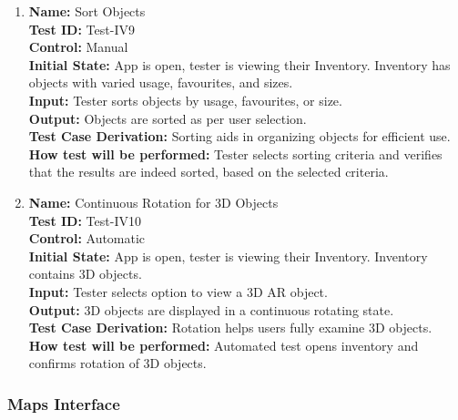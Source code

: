 \documentclass[12pt, titlepage]{article}
\begin{document}
\begin{enumerate}
  \item \textbf{Name:} Sort Objects \label{itm:Test-IV9} \\
        \textbf{Test ID:} Test-IV9 \\
        \textbf{Control:} Manual \\
        \textbf{Initial State:} App is open, tester is viewing their Inventory. Inventory has objects with varied usage, favourites, and sizes. \\
        \textbf{Input:} Tester sorts objects by usage, favourites, or size. \\
        \textbf{Output:} Objects are sorted as per user selection. \\
        \textbf{Test Case Derivation:} Sorting aids in organizing objects for efficient use. \\
        \textbf{How test will be performed:} Tester selects sorting criteria and verifies that the results are indeed sorted, based on the selected criteria. \\

  \item \textbf{Name:} Continuous Rotation for 3D Objects \label{itm:Test-IV10} \\
        \textbf{Test ID:} Test-IV10 \\
        \textbf{Control:} Automatic \\
        \textbf{Initial State:} App is open, tester is viewing their Inventory. Inventory contains 3D objects. \\
        \textbf{Input:} Tester selects option to view a 3D AR object. \\
        \textbf{Output:} 3D objects are displayed in a continuous rotating state. \\
        \textbf{Test Case Derivation:} Rotation helps users fully examine 3D objects. \\
        \textbf{How test will be performed:} Automated test opens inventory and confirms rotation of 3D objects. \\

\end{enumerate}

\subsubsection{Maps Interface}
\end{document}
